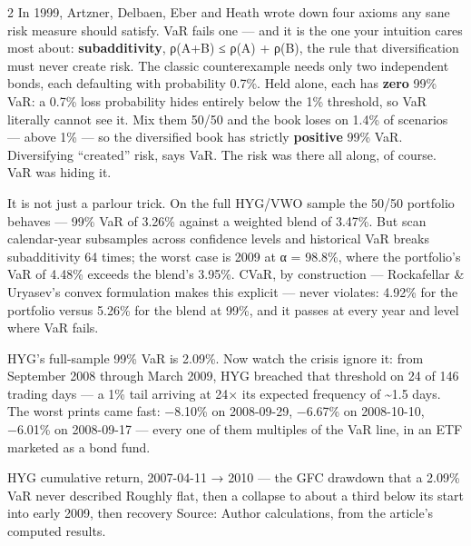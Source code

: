 \documentclass{pyportfolios-note}
\begin{document}
\begin{multicols}{2}
In 1999, Artzner, Delbaen, Eber and Heath wrote down four axioms any sane risk
measure should satisfy. VaR fails one — and it is the one your intuition cares
most about: \textbf{subadditivity}, ρ(A+B) ≤ ρ(A) + ρ(B), the rule that
diversification must never create risk. The classic counterexample needs only two
independent bonds, each defaulting with probability 0.7\%. Held alone, each has
\textbf{zero} 99\% VaR: a 0.7\% loss probability hides entirely below the 1\%
threshold, so VaR literally cannot see it. Mix them 50/50 and the book loses on
1.4\% of scenarios — above 1\% — so the diversified book has strictly
\textbf{positive} 99\% VaR. Diversifying ``created'' risk, says VaR. The risk was
there all along, of course. VaR was hiding it.

It is not just a parlour trick. On the full HYG/VWO sample the 50/50 portfolio
behaves — 99\% VaR of 3.26\% against a weighted blend of 3.47\%. But scan
calendar-year subsamples across confidence levels and historical VaR breaks
subadditivity 64 times; the worst case is 2009 at α = 98.8\%, where the
portfolio's VaR of 4.48\% exceeds the blend's 3.95\%. CVaR, by construction —
Rockafellar \& Uryasev's convex formulation makes this explicit — never violates:
4.92\% for the portfolio versus 5.26\% for the blend at 99\%, and it passes at
every year and level where VaR fails.
\end{multicols}


\noteneedroom{190bp}

HYG's full-sample 99\% VaR is 2.09\%. Now watch the crisis ignore it: from
September 2008 through March 2009, HYG breached that threshold on 24 of 146
trading days — a 1\% tail arriving at 24× its expected frequency of
\textasciitilde1.5 days. The worst prints came fast: −8.10\% on 2008-09-29,
−6.67\% on 2008-10-10, −6.01\% on 2008-09-17 — every one of them multiples of the
VaR line, in an ETF marketed as a bond fund.

  {HYG cumulative return, 2007-04-11 → 2010 — the GFC drawdown that a 2.09\% VaR never described}
  {Roughly flat, then a collapse to about a third below its start into early
   2009, then recovery}
  {Source: Author calculations, from the article's computed results.}
\end{document}
